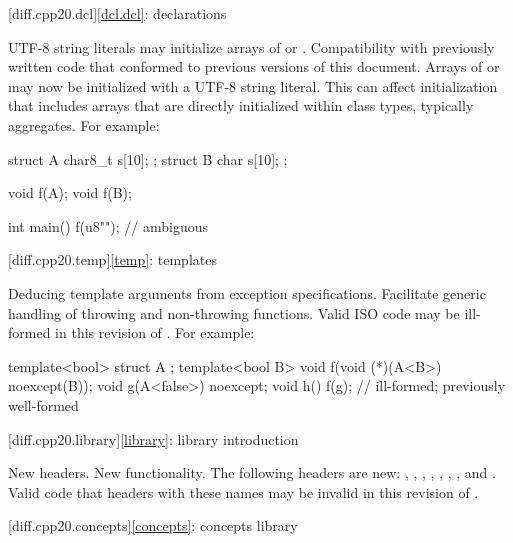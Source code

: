 [diff.cpp20.dcl]{\ref{dcl.dcl}: declarations}

\change
UTF-8 string literals may initialize arrays of  or
.
\rationale
Compatibility with previously written code that conformed to previous versions of this document.
\effect
Arrays of  or 
may now be initialized with a UTF-8 string literal.
This can affect initialization that includes arrays
that are directly initialized within class types, typically aggregates.
For example:
\begin{codeblock}
struct A {
  char8_t s[10];
};
struct B {
  char s[10];
};

void f(A);
void f(B);

int main() {
  f({u8""});            // ambiguous
}
\end{codeblock}

[diff.cpp20.temp]{\ref{temp}: templates}

\change
Deducing template arguments from exception specifications.
\rationale
Facilitate generic handling of throwing and non-throwing functions.
\effect
Valid ISO \CppXX{} code may be ill-formed in this revision of \Cpp{}.
For example:
\begin{codeblock}
template<bool> struct A { };
template<bool B> void f(void (*)(A<B>) noexcept(B));
void g(A<false>) noexcept;
void h() {
  f(g);                         // ill-formed; previously well-formed
}
\end{codeblock}

[diff.cpp20.library]{\ref{library}: library introduction}

\change
New headers.
\rationale
New functionality.
\effect
The following \Cpp{} headers are new:
,
,
,
,
,
,
, and
.
Valid \CppXX{} code that  headers with these names may be
invalid in this revision of \Cpp{}.

[diff.cpp20.concepts]{\ref{concepts}: concepts library}

